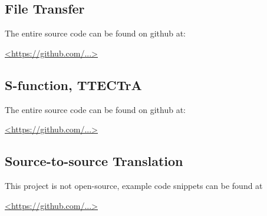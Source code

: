\documentclass[heading.tex]{subfiles}
\begin{document}
\newpage
\appendix

\subsection{File Transfer}

The entire source code can be found on github at:

\url{<https://github.com/...>}

\subsection{S-function, TTECTrA}

The entire source code can be found on github at:

\url{<https://github.com/...>}

\subsection{Source-to-source Translation}

This project is not open-source, example code snippets can be found at

\url{<https://github.com/...>}

\end{document}
